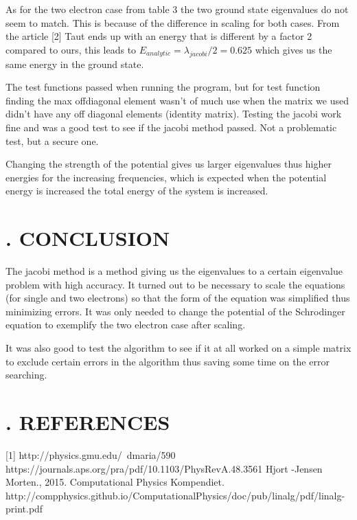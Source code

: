 \documentclass[twocolumn]{article}
\begin{document}
As for the two electron case from table 3 the two ground state eigenvalues do not seem to match. This is because of the difference in scaling for both cases. From the article [2] Taut ends up with an energy that is different by a factor 2 compared to ours, this leads to $E_{analytic} = \lambda_{jacobi}/2 = 0.625$ which gives us the same energy in the ground state.

The test functions passed when running the program, but for test function finding the max offdiagonal element wasn't of much use when the matrix we used didn't have any off diagonal elements (identity matrix). Testing the jacobi work fine and was a good test to see if the jacobi method passed. Not a problematic test, but a secure one. 

Changing the strength of the potential gives us larger eigenvalues thus higher energies for the increasing frequencies, which is expected when the potential energy is increased the total energy of the system is increased.   
\section*{. CONCLUSION} 
The jacobi method is a method giving us the eigenvalues to a certain eigenvalue problem with high accuracy. It turned out to be necessary to scale the equations (for single and two electrons) so that the form of the equation was simplified thus minimizing errors. It was only needed to change the potential of the Schrodinger equation to exemplify the two electron case after scaling. 

It was also good to test the algorithm to see if it at all worked on a simple matrix to exclude certain errors in the algorithm thus saving some time on the error searching.  
\section*{. REFERENCES}
[1] http://physics.gmu.edu/~dmaria/590%
\newline
[2] https://journals.aps.org/pra/pdf/10.1103/PhysRevA.48.3561
\newline
[3]Hjort -Jensen Morten., 2015. Computational Physics Kompendiet. 
\newline
http://compphysics.github.io/ComputationalPhysics/doc/pub/linalg/pdf/linalg-print.pdf
\end{document}
